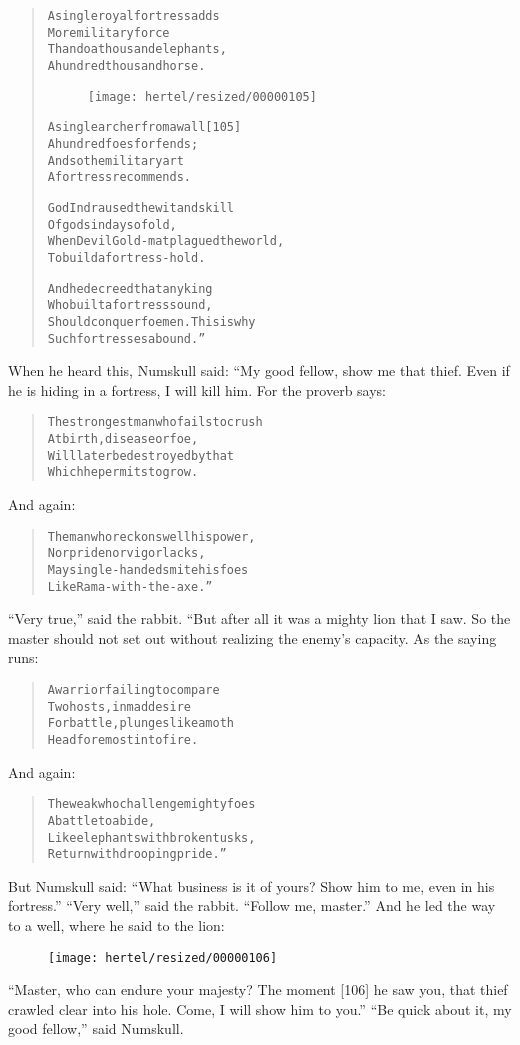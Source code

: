 \documentclass[article, twoside, 10pt]{memoir}
\renewenvironment{verbatim}{%
\begin{quote}%
\vskip -10pt%
\begin{alltt}\normalfont\small}{\end{alltt}%
\end{quote}%
\vskip -10pt
} %
\begin{document}
\begin{verbatim}
A single royal fortress adds
    More military force
Than do a thousand elephants,
    A hundred thousand horse.

\begin{figure}[p]\texttt{[image: hertel/resized/00000105]}\end{figure}A single archer from a wall                             [105]
    A hundred foes forfends;
And so the military art
    A fortress recommends.

God Indra used the wit and skill
    Of gods in days of old,
When Devil Gold-mat plagued the world,
    To build a fortress-hold.

And he decreed that any king
    Who built a fortress sound,
Should conquer foemen. This is why
    Such fortresses abound.”
\end{verbatim}
When he heard this, Numskull said: “My good fellow, show me that
thief. Even if he is hiding in a fortress, I will kill him. For the
proverb says:

\begin{verbatim}
The strongest man who fails to crush
    At birth, disease or foe,
Will later be destroyed by that
    Which he permits to grow.
\end{verbatim}
And again:

\begin{verbatim}
The man who reckons well his power,
    Nor pride nor vigor lacks,
May single-handed smite his foes
    Like Rama-with-the-axe.”
\end{verbatim}
``Very true,'' said the rabbit. “But after all it was a mighty lion
that I saw. So the master should not set out without realizing the
enemy's capacity. As the saying runs:

\begin{verbatim}
A warrior failing to compare
    Two hosts, in mad desire
For battle, plunges like a moth
    Headforemost into fire.
\end{verbatim}
And again:

\begin{verbatim}
The weak who challenge mighty foes
    A battle to abide,
Like elephants with broken tusks,
    Return with drooping pride.”
\end{verbatim}
But Numskull said:
``What business is it of yours? Show him to me, even in his fortress.''
``Very well,'' said the rabbit. ``Follow me, master.'' And he led
the way to a well, where he said to the lion:
\begin{figure}[p]\texttt{[image: hertel/resized/00000106]}\end{figure}``Master, who can endure your majesty? The moment [106] he saw you, that thief crawled clear into his hole. Come, I will show him to you.''
``Be quick about it, my good fellow,'' said Numskull.
\end{document}
